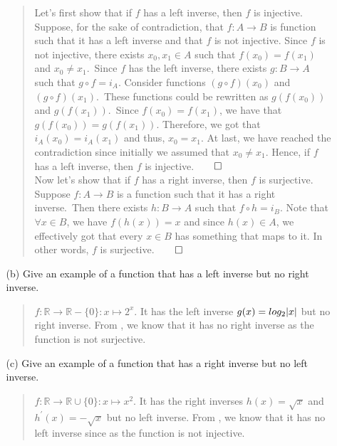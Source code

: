 \documentclass[12pt, a4paper]{article}
\newcommand{\reals}{\mathbb{R}} %
\newcommand\und[1]{\underline{\smash{#1}}}
\DeclarePairedDelimiter\abs{\lvert}{\rvert}
\newcommand{\rarr}{\rightarrow}
\begin{document}
\begin{itemize}
\begin{itemize}
\begin{quote}
Let's first show that if $f$ has a left inverse, then $f$ is injective.\\
\medskip
Suppose, for the sake of contradiction, that $f : A \rarr B$ is function such that it has a left inverse
and that $f$ is not injective. Since $f$ is not injective, there exists $x_0, x_1 \in A$ such that $f(x_0) = f(x_1)$ and $x_0 \neq x_1$.\
Since $f$ has the left inverse, there exists $g : B \rarr A$ such that $g \circ f = i_A$.
Consider functions $(g \circ f)(x_0)$ and $(g \circ f)(x_1)$.\ These functions could be rewritten as
$g(f(x_0))$ and $g(f(x_1))$.\ Since $f(x_0) = f(x_1)$, we have that $g(f(x_0)) = g(f(x_1))$. Therefore,
we got that $i_A(x_0) = i_A(x_1)$ and thus, $x_0 = x_1$. At last, we have reached the contradiction since initially we assumed that $x_0 \neq x_1$.
Hence, if $f$ has a left inverse, then $f$ is injective.$\qed$
\\
\bigskip
Now let's show that if $f$ has a right inverse, then $f$ is surjective.\\
\medskip
Suppose $f : A \rarr B$ is a function such that it has a right inverse.\
Then there exists $h : B \rarr A$ such that $f \circ h = i_B$.
Note that $\forall x \in B$, we have $f(h(x)) = x$ and since $h(x) \in A$,
we effectively got that every $x \in B$ has something that maps to it.
In other words, $f$ is surjective.$\qed$
\end{quote}

\item[]

\item[(b)]
Give an example of a function that has a left inverse but no right inverse.
\begin{quote}
$f : \reals \rarr \reals - \{0\} : x \mapsto 2^x$. It has the left inverse $g(x) = log_2{\abs{x}}$ but no right inverse.
From \und{\textbf{exercise (a)}}, we know that it has no right inverse as the function is not surjective.
\end{quote}

\item[]

\item[(c)]
Give an example of a function that has a right inverse but no left inverse.
\begin{quote}
$f : \reals \rarr \reals \cup \{0\} : x \mapsto x^2$. It has the right inverses $h(x) = \sqrt{x}$ and $h^{\prime}(x) = -\sqrt{x}$ but no left inverse.
From \und{\textbf{exercise (a)}}, we know that it has no left inverse since as the function is not injective.
\end{quote}


\end{itemize}
\end{itemize}
\end{document}
